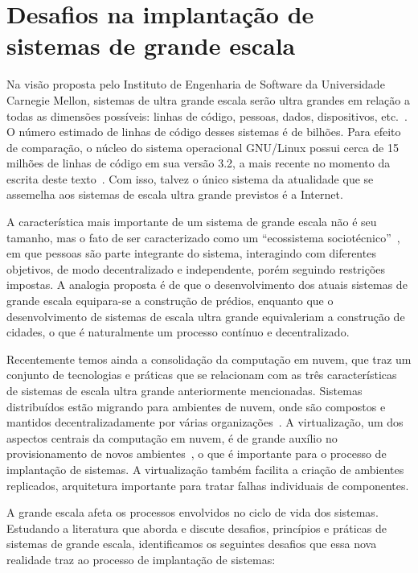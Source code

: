\section{Desafios na implantação de sistemas de grande escala}
\label{sec:desafios}

Na visão proposta pelo Instituto de Engenharia de Software da Universidade Carnegie Mellon, sistemas de ultra grande escala serão ultra grandes em relação a todas as dimensões possíveis: linhas de código, pessoas, dados, dispositivos, etc.~\cite{CarnegieMellon2006ULS}. O número estimado de linhas de código desses sistemas é de bilhões. Para efeito de comparação, o núcleo do sistema operacional GNU/Linux possui cerca de 15 milhões de linhas de código em sua versão 3.2, a mais recente no momento da escrita deste texto~\cite{Leemhuis2012Statistics}. Com isso, talvez o único sistema da atualidade que se assemelha aos sistemas de escala ultra grande previstos é a Internet. 

A característica mais importante de um sistema de grande escala não é seu tamanho, mas o fato de ser caracterizado como um ``ecossistema sociotécnico''~\cite{CarnegieMellon2006ULS}, em que pessoas são parte integrante do sistema, interagindo com diferentes objetivos, de modo decentralizado e independente, porém seguindo restrições impostas. A analogia proposta é de que o desenvolvimento dos atuais sistemas de grande escala equipara-se a construção de prédios, enquanto que o desenvolvimento de sistemas de escala ultra grande equivaleriam a construção de cidades, o que é naturalmente um processo contínuo e decentralizado.

Recentemente temos ainda a consolidação da computação em nuvem, que traz um conjunto de tecnologias e práticas que se relacionam com as três características de sistemas de escala ultra grande anteriormente mencionadas. Sistemas distribuídos estão migrando para ambientes de nuvem, onde são compostos e mantidos decentralizadamente por várias organizações~\cite{Steen2011VeryLarge}. A virtualização, um dos aspectos centrais da computação em nuvem, é de grande auxílio no provisionamento de novos ambientes~\cite{Humble2011Continuous}, o que é importante para o processo de implantação de sistemas. A virtualização também facilita a criação de ambientes replicados, arquitetura importante para tratar falhas individuais de componentes.

A grande escala afeta os processos envolvidos no ciclo de vida dos sistemas.
Estudando a literatura que aborda e discute desafios, princípios e práticas de
sistemas de grande escala, identificamos os seguintes desafios que essa nova
realidade traz ao processo de implantação de sistemas:

